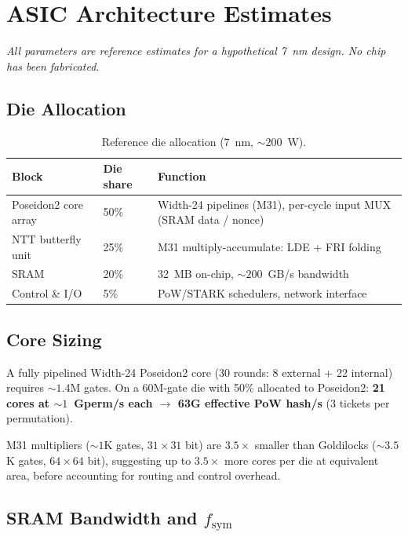 \documentclass[11pt,a4paper]{article}
\begin{document}
\appendix

\section{ASIC Architecture Estimates}
\label{app:asic}

\emph{All parameters are reference estimates for a hypothetical 7~nm design. No chip has been fabricated.}

\subsection{Die Allocation}
\label{sec:die}

\begin{table}[h]
\centering
\begin{tabular}{@{}lll@{}}
\toprule
Block & Die share & Function \\
\midrule
Poseidon2 core array & 50\% & Width-24 pipelines (M31), per-cycle input MUX (SRAM data / nonce) \\
NTT butterfly unit & 25\% & M31 multiply-accumulate: LDE + FRI folding \\
SRAM & 20\% & 32~MB on-chip, ${\sim}200$~GB/s bandwidth \\
Control \& I/O & 5\% & PoW/STARK schedulers, network interface \\
\bottomrule
\end{tabular}
\caption{Reference die allocation (7~nm, ${\sim}200$~W).}
\label{tab:die-alloc}
\end{table}

\subsection{Core Sizing}

A fully pipelined Width-24 Poseidon2 core (30 rounds: 8 external $+$ 22 internal) requires ${\sim}1.4$M gates. On a 60M-gate die with 50\% allocated to Poseidon2: \textbf{21 cores at ${\sim}1$~Gperm/s each $\to$ 63G effective PoW hash/s} (3 tickets per permutation).

M31 multipliers (${\sim}1$K gates, $31 \times 31$ bit) are $3.5\times$ smaller than Goldilocks (${\sim}3.5$K gates, $64 \times 64$ bit), suggesting up to $3.5\times$ more cores per die at equivalent area, before accounting for routing and control overhead.

\subsection{SRAM Bandwidth and $f_{\mathrm{sym}}$}
\label{sec:sram}
\end{document}
